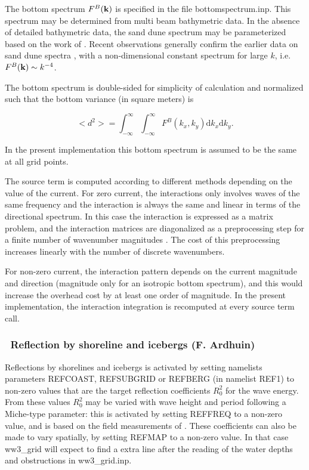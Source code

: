 The bottom spectrum $F^B({\mbox{\bf k}})$ is specified in the file {\file
bottomspectrum.inp}. This spectrum may be determined from multi beam
bathymetric data.  In the absence of detailed bathymetric data, the sand dune
spectrum may be parameterized based on the work of \cite{art:Hino68}.  Recent
observations generally confirm the earlier data on sand dune spectra
\citep{art:AM07}, with a non-dimensional constant spectrum for large $k$,
i.e. $F^B({\mbox{\bf k}}) \sim k^{-4}$.

The bottom spectrum is double-sided for simplicity of calculation
and normalized such that the bottom variance (in square meters) is

\begin{equation}
<d^2> =\int_{-\infty}^{\infty} \int_{-\infty}^{\infty}
F^B(k_x,k_y)  {\mathrm d} k_x  {\mathrm d} k_y.
\end{equation}

\noindent
In the present implementation this bottom spectrum is assumed to be the same
at all grid points.

The source term is computed according to different methods depending on the
value of the current. For zero current, the interactions only involves waves
of the same frequency and the interaction is always the same and linear in
terms of the directional spectrum. In this case the interaction is expressed
as a matrix problem, and the interaction matrices are diagonalized as a
preprocessing step for a finite number of wavenumber magnitudes
\citep{art:AH02}.  The cost of this preprocessing increases linearly with the
number of discrete wavenumbers.

For non-zero current, the interaction pattern depends on the current magnitude
and direction (magnitude only for an isotropic bottom spectrum), and this
would increase the overhead cost by at least one order of magnitude. In the
present implementation, the interaction integration is recomputed at every
source term call.

\vsssub
\subsubsection{~Reflection by shoreline and icebergs  \hfill {\rm (F. Ardhuin)}} 
\label{sec:ref}
\vsssub
Reflections by shorelines and icebergs is activated by setting namelists parameters REFCOAST, REFSUBGRID or REFBERG 
(in namelist REF1) to non-zero values that are the target reflection coefficients $R_0^2$ for the wave energy. 
From these values $R_0^2$ may be varied with wave height and period following a Miche-type parameter: this is 
activated by setting REFFREQ to a non-zero value, and is  based on the field 
measurements of \cite{art:EHG94}. 
These coefficients can also be made to vary spatially, by 
setting REFMAP to a non-zero value. In that case ww3\_grid will expect to find a extra line after the reading 
of the water depths and obstructions in ww3\_grid.inp. 

